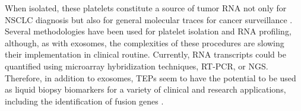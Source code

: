 When isolated, these platelets constitute a source of tumor RNA not only for NSCLC diagnosis but also for general molecular traces for cancer surveillance \cite{LB_atocha, Platelets}. Several methodologies have been used for platelet isolation and RNA profiling, although, as with exosomes, the complexities of these procedures are slowing their implementation in clinical routine. Currently, RNA transcripts could be quantified using microarray hybridization techniques, RT-PCR, or NGS. Therefore, in addition to exosomes, TEPs seem to have the potential to be used as liquid biopsy biomarkers for a variety of clinical and research applications, including the identification of fusion genes \cite{LB_atocha}.